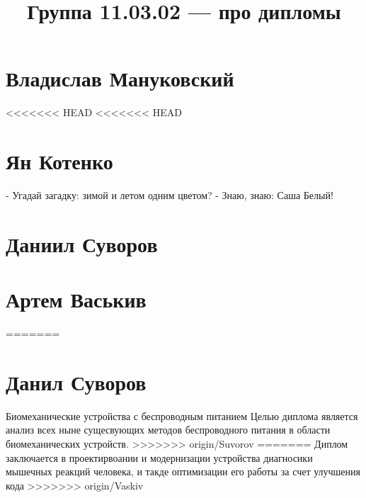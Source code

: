 \documentclass{article}
\title{Группа 11.03.02 --- про дипломы}
\begin{document}
\section*{Владислав Мануковский}
<<<<<<< HEAD
<<<<<<< HEAD

\section*{Ян Котенко}
- Угадай загадку: зимой и летом одним цветом?
- Знаю, знаю: Саша Белый!

\section*{Даниил Суворов}

\section*{Артем Васькив}
=======
\section*{Данил Суворов}
Биомеханические устройства с беспроводным питанием
Целью диплома является анализ всех ныне сущесвующих методов беспроводного питания в области биомеханических устройств.
>>>>>>> origin/Suvorov
=======
Диплом заключается в проектирвоании и модернизации устройства диагносики мышечных реакций человека, и такде оптимизации его работы за счет улучшения кода
>>>>>>> origin/Vaskiv
\end{document}
